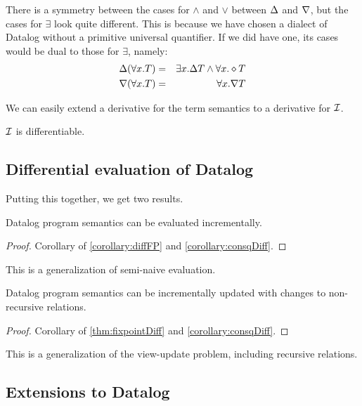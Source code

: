 There is a symmetry between the cases for $\wedge$ and $\vee$ between $\Delta$
and $\nabla$, but the cases for $\exists$ look quite different. 
This is because we have chosen a dialect of Datalog without a primitive universal quantifier.
If we did have one, its cases would be dual to those for $\exists$, namely:
\begin{eqnarray*}
\Delta(\forall x.T) & = & \exists x. \Delta T \wedge \forall x. \diamond T\\
\nabla(\forall x.T) & = & \forall x. \nabla T
\end{eqnarray*}

We can easily extend a derivative for the term semantics to a derivative for $\mathcal{I}$.

\begin{corollary}
\label{corollary:consqDiff}
  $\mathcal{I}$ is differentiable.
\end{corollary}

\subsection{Differential evaluation of Datalog}

Putting this together, we get two results.

\begin{thm}
\label{thm:diffEval}
  Datalog program semantics can be evaluated incrementally.
\end{thm}
\begin{proof}
  Corollary of \ref{corollary:diffFP} and \ref{corollary:consqDiff}.
\end{proof}

This is a generalization of semi-naive evaluation.

\begin{thm}
\label{thm:diffUpdate}
  Datalog program semantics can be incrementally updated with changes to non-recursive relations.
\end{thm}
\begin{proof}
  Corollary of \ref{thm:fixpointDiff} and \ref{corollary:consqDiff}.
\end{proof}

This is a generalization of the view-update problem, including recursive relations.

\subsection{Extensions to Datalog}

